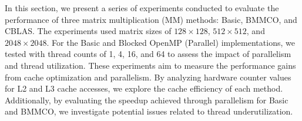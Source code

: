
In this section, we present a series of experiments conducted to evaluate the performance of three matrix multiplication (MM) methods: Basic, BMMCO, and CBLAS. The experiments used matrix sizes of \(128 \times 128\), \(512 \times 512\), and \(2048 \times 2048\). For the Basic and Blocked OpenMP (Parallel) implementations, we tested with thread counts of 1, 4, 16, and 64 to assess the impact of parallelism and thread utilization. These experiments aim to measure the performance gains from cache optimization and parallelism. By analyzing hardware counter values for L2 and L3 cache accesses, we explore the cache efficiency of each method. Additionally, by evaluating the speedup achieved through parallelism for Basic and BMMCO, we investigate potential issues related to thread underutilization.